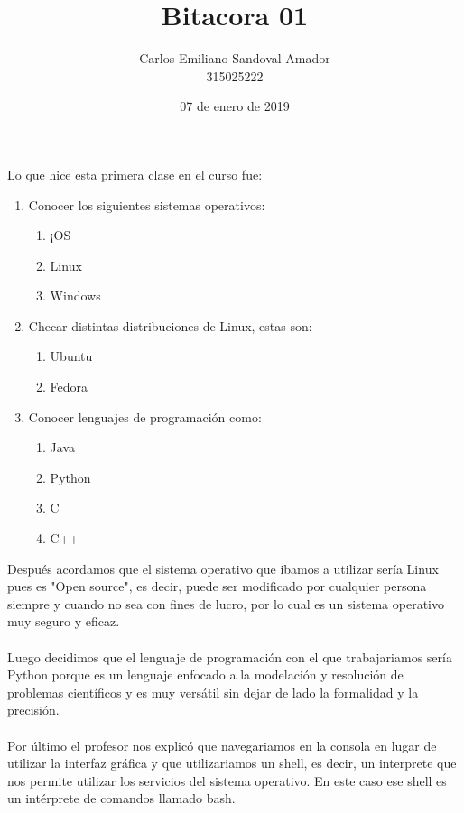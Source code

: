 \documentclass[letterpaper, 12pt, oneside]{article}%
\title{Bitacora 01}
\author{Carlos Emiliano Sandoval Amador \\ 315025222}
\date{07 de enero de 2019}
\begin{document}
	\maketitle %
	{Lo que hice esta primera clase en el curso fue:}
	\begin{enumerate} %
		\item Conocer los siguientes sistemas operativos:
		\begin{enumerate} %
			\item ¡OS
			\item Linux
			\item Windows
		\end{enumerate} 
		\item Checar distintas distribuciones de Linux,
		estas son:
		\begin{enumerate} %
			\item Ubuntu
			\item Fedora
		\end{enumerate}
		\item Conocer lenguajes de programación como:
		\begin{enumerate} %
			\item Java
			\item Python
			\item C
			\item C++
			
		\end{enumerate}
		
	\end{enumerate} 
{Después acordamos que el sistema operativo que ibamos a utilizar sería Linux pues es "Open source", es decir, puede ser modificado por cualquier persona siempre y cuando no sea con fines de lucro, por lo cual es un sistema operativo muy seguro y eficaz.\\ \\}
{Luego decidimos que el lenguaje de programación con el que trabajariamos sería Python porque es un lenguaje enfocado a la modelación y resolución de problemas científicos y es muy versátil sin dejar de lado la formalidad y la precisión. \\ \\}
{Por último el profesor nos explicó que navegariamos en la consola en lugar de utilizar la interfaz gráfica y que utilizariamos un shell, es decir, un interprete que nos permite utilizar los servicios del sistema operativo. En este caso ese shell es un intérprete de comandos llamado bash.}
	
\end{document}
